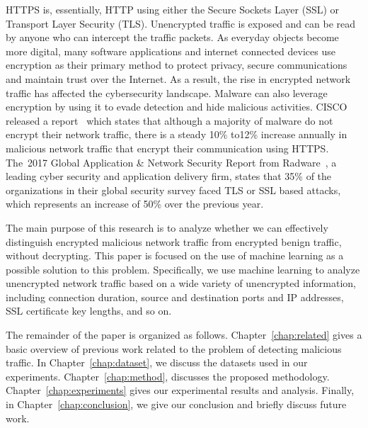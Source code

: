 HTTPS is, essentially, HTTP using either the Secure Sockets Layer (SSL) or Transport Layer Security (TLS). Unencrypted traffic is exposed and can be read by anyone who can intercept the traffic packets. As everyday objects become more digital, many software applications and internet connected devices use encryption as their primary method to protect privacy, secure communications and maintain trust over the Internet. As a result, the rise in encrypted network traffic has affected the cybersecurity landscape. Malware can also leverage encryption by using it to evade detection and hide malicious activities. CISCO released a report~\cite{Anderson16} which states that although a majority of malware do not encrypt their network traffic, there is a steady 10\% to12\% increase annually in malicious network traffic that encrypt their communication using HTTPS. The~2017 Global Application \& Network Security Report from 
Radware~\cite{Radware17}, a leading cyber security and application delivery firm, states that 35\% of the organizations in their global security survey faced TLS or SSL based attacks, which represents an increase of 50\% over the previous year.

The main purpose of this research is to analyze whether we can effectively distinguish encrypted malicious network traffic from encrypted benign traffic, without decrypting. This paper is focused on the use of machine learning as a possible solution to this problem. Specifically, we use machine learning to analyze unencrypted network traffic based on a wide variety of unencrypted information, including connection duration, source and destination ports and IP addresses, SSL certificate key lengths, and so on.

The remainder of the paper is organized as follows. Chapter~\ref{chap:related} gives a basic overview of previous work related to the problem of detecting malicious traffic. In Chapter~\ref{chap:dataset}, we discuss the datasets used in our experiments. Chapter~\ref{chap:method}, discusses the proposed methodology. Chapter~\ref{chap:experiments} gives our experimental results and analysis. Finally, in Chapter~\ref{chap:conclusion}, we give our conclusion and briefly discuss future work.
